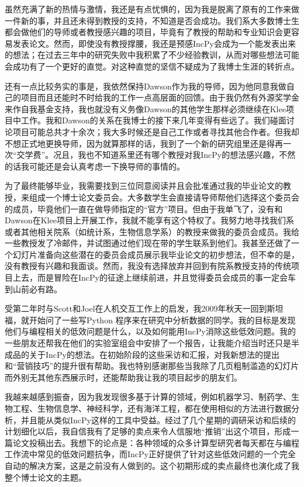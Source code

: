 \documentclass[letter,12pt]{book}
\begin{document}
\begin{CJK}{UTF8}{gbsn}
虽然充满了新的热情与激情，我还是有点忧惧的，因为我是脱离了原有的工作来做一件新的事，并且还未得到教授的支持，不知道是否会成功。我们系大多数博士生都会做他们的导师或者教授感兴趣的项目，毕竟有了教授的帮助和专业知识会更容易发表论文。然而，即使没有教授撑腰，我还是预感IncPy会成为一个能发表出来的想法；在过去三年中的研究失败中我积累了不少经验教训，从而对哪些想法可能会成功有了一个更好的直觉。对这种直觉的坚信不疑成为了我博士生涯的转折点。

还有一点比较务实的事是，我依然保持Dawson作为我的导师，因为他同意我做自己的项目而且还能时不时给我的工作一点高层面的回馈。由于我仍然有外源奖学金来作自我基金支持，我也就没有义务像Dawson的其他学生那样必须继续在Klee项目中工作。我和Dawson的关系在我博士的接下来几年变得有些远了。我们碰面讨论项目可能总共才十余次；我大多时候还是自己工作或者寻找其他合作者。但我却不想正式地更换导师，因为就算那样的话，我到了一个新的研究组里还是得再一次“交学费”。况且，我也不知道系里还有哪个教授对我IncPy的想法感兴趣，不然的话我可能还是会认真考虑一下换导师的事情的。

为了最终能够毕业，我需要找到三位同意阅读并且会批准通过我的毕业论文的教授，来组成一个博士论文委员会。大多数学生会直接请导师帮他们选择这个委员会的成员，毕竟他们一直在做导师指定的“官方”项目。但由于我单飞了，没有和Dawson在Klee项目上开展工作，我就不能享有这个特权了。我努力地寻找我们系或者其他相关院系（如统计系，生物信息学系）的教授来做我的委员会成员。我给一些教授发了冷邮件，并试图通过他们现在带的学生联系到他们。我甚至还做了一个幻灯片准备向这些潜在的委员会成员展示我毕业论文的初步想法，但不幸的是，没有教授有兴趣和我面谈。然而，我没有选择放弃并回到有院系教授支持的传统项目上去，而是冒险在IncPy的征途上继续前进，并且觉得委员会成员的事一定会车到山前必有路。

\breakline

受第二年时与Scott和Joel在人机交互工作上的启发，我2009年秋天一回到斯坦福，就开始问了一些写Python 程序来在研究中分析数据的同学。我的目标是发现他们与编程相关的低效问题是什么，以及如何能用IncPy消除这些低效问题。我的一些朋友还帮我在他们的实验室组会中安排了一个报告，让我能介绍当时还只是半成品的关于IncPy的想法。在初始阶段的这些采访和汇报，对我新想法的提出和“营销技巧”的提升很有帮助。我也特别感谢那些当我除了几页粗制滥造的幻灯片而外别无其他东西展示时，还能帮助我让我的项目起步的朋友们。

我越来越感到振奋，因为我发现很多基于计算的领域，例如机器学习、制药学、生物工程、生物信息学、神经科学，还有海洋工程，都在使用相似的方法进行数据分析，并且能从类似IncPy这样的工具中受益。经过了几个星期的调研采访和后续的计划细化以后，我自信我有了足够的卖点来令人信服地“推销”出这个项目，形成一篇论文投稿出去。我想下的论点是：各种领域的众多计算型研究者每天都在与编程工作流中常见的低效问题抗争，而IncPy正好提供了针对这些低效问题的一个完全自动的解决方案，这是之前没有人做到的。这个初期形成的卖点最终也演化成了我整个博士论文的主题。


\end{CJK}
\end{document}
